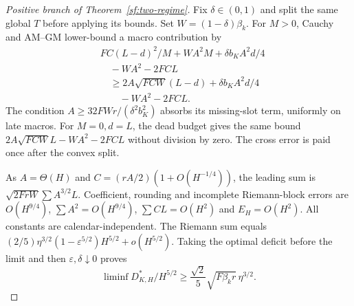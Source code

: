 \documentclass[journal]{IEEEtran}
\begin{document}
\begin{proof}[Positive branch of Theorem~\ref{sf:two-regime}]
Fix $\delta\in(0,1)$ and split the same global $T$ before applying its bounds.
Set $W=(1-\delta)\beta_k$.
For $M>0$, Cauchy and AM--GM lower-bound a macro contribution by
\[
\begin{aligned}
&FC(L-d)^2/M+WA^2M+\delta b_KA^2d/4\\
&\quad-WA^2-2FCL\\
&\quad\ge2A\sqrt{FCW}(L-d)+\delta b_KA^2d/4\\
&\qquad-WA^2-2FCL.
\end{aligned}
\]
The condition $A\ge32FWr/(\delta^2b_K^2)$ absorbs its missing-slot term,
uniformly on late macros. For $M=0,d=L$, the dead budget gives the same
bound $2A\sqrt{FCW}L-WA^2-2FCL$ without division by zero.
The cross error is paid once after the convex split.

As $A=\Theta(H)$ and $C=(rA/2)(1+O(H^{-1/4}))$, the leading sum is
$\sqrt{2FrW}\sum A^{3/2}L$.
Coefficient, rounding and incomplete Riemann-block errors are $O(H^{9/4})$,
$\sum A^2=O(H^{9/4})$, $\sum CL=O(H^2)$ and $E_H=O(H^2)$.
All constants are calendar-independent.
The Riemann sum equals
$(2/5)\eta^{3/2}(1-\varepsilon^{5/2})H^{5/2}+o(H^{5/2})$.
Taking the optimal deficit before the limit and then
$\varepsilon,\delta\downarrow0$ proves
\begin{equation}\label{sf:lower}
\liminf D_{K,H}^*/H^{5/2}\ge
\frac{\sqrt2}{5}\sqrt{F\beta_k r}\,\eta^{3/2}.
\end{equation}


\end{proof}
\end{document}
